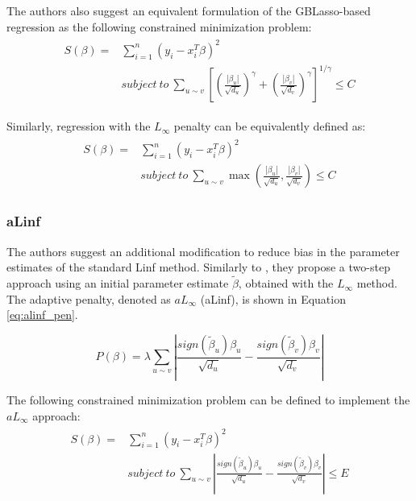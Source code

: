 The authors also suggest an equivalent formulation of the GBLasso-based regression as the following constrained minimization problem:
\begin{align} \label{eq:gblasso_constrained}
\begin{split}
S(\beta) = &\sum_{i=1}^{n} (y_i - x_i^T\beta)^2 \\ 
&subject\ to\ \sum_{u \sim v}
\left[\left(\frac{|\beta_u|}{\sqrt{d_u}}\right)^\gamma+
\left(\frac{|\beta_v|}{\sqrt{d_v}}\right)^\gamma\right]^{1/\gamma}\leq C
\end{split}
\end{align}

Similarly, regression with the $L_\infty$ penalty can be equivalently defined as:
\begin{align} \label{eq:linf_constrained}
\begin{split}
S(\beta) = &\sum_{i=1}^{n} (y_i - x_i^T\beta)^2 \\ 
&subject\ to\ \sum_{u \sim v}\max\left(\frac{|\beta_u|}{\sqrt{d_u}},\frac{|\beta_v|}{\sqrt{d_v}}\right)\leq C
\end{split}
\end{align}

\subsubsection{aLinf} \label{sec:alinf}
The authors suggest an additional modification to reduce bias in the parameter estimates of the standard Linf method. Similarly to \cite{li2010variable}, they propose a two-step approach using an initial parameter estimate $\tilde{\beta}$, obtained with the $L_\infty$ method. The adaptive penalty, denoted as $aL_\infty$ (aLinf), is shown in Equation \ref{eq:alinf_pen}.

\begin{equation} \label{eq:alinf_pen}
P(\beta) = \lambda\sum_{u \sim v}\left|\frac{sign(\tilde{\beta}_u)\beta_u}{\sqrt{d_u}}-\frac{sign(\tilde{\beta}_v)\beta_v}{\sqrt{d_v}}\right|
\end{equation}

The following constrained minimization problem can be defined to implement the $aL_\infty$ approach:
\begin{align} \label{eq:alinf_constrained}
\begin{split}
S(\beta) = &\sum_{i=1}^{n} (y_i - x_i^T\beta)^2 \\ 
&subject\ to\ \sum_{u \sim v}\left|\frac{sign(\tilde{\beta}_u)\beta_u}{\sqrt{d_u}}-\frac{sign(\tilde{\beta}_v)\beta_v}{\sqrt{d_v}}\right|\leq E
\end{split}
\end{align}


